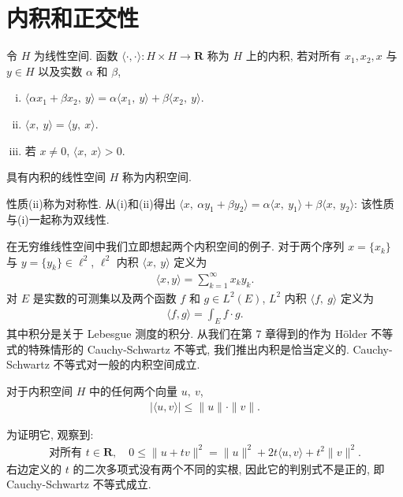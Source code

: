 \documentclass[../../main.tex]{subfiles}
\begin{document}
\section{内积和正交性}\label{section:ch16-inner-product}

\begin{definition}[内积空间]\label{definition:ch16-inner-product}
令 $H$ 为线性空间. 函数 $\langle\cdot,\cdot\rangle:H\times H\to\mathbf{R}$ 称为 $H$ 上的内积, 若对所有 $x_{1},x_{2},x$ 与 $y\in H$ 以及实数 $\alpha$ 和 $\beta$,
\begin{enumerate}[(i)]
\item $\langle\alpha x_{1}+\beta x_{2},\ y\rangle=\alpha\langle x_{1},\ y\rangle+\beta\langle x_{2},\ y\rangle$.
\item $\langle x,\ y\rangle=\langle y,\ x\rangle$.
\item 若 $x\neq 0$, $\langle x,\ x\rangle>0$.
\end{enumerate}
具有内积的线性空间 $H$ 称为内积空间.
\end{definition}

性质(ii)称为对称性. 从(i)和(ii)得出 $\langle x,\ \alpha y_{1}+\beta y_{2}\rangle=\alpha\langle x,\ y_{1}\rangle+\beta\langle x,\ y_{2}\rangle$: 该性质与(i)一起称为双线性.

在无穷维线性空间中我们立即想起两个内积空间的例子. 对于两个序列 $x=\{x_{k}\}$ 与 $y=\{y_{k}\}\in\ell^{2}$, $\ell^{2}$ 内积 $\langle x,\ y\rangle$ 定义为
\begin{align*}
\langle x,y\rangle=\sum_{k=1}^{\infty}x_{k}y_{k}.
\end{align*}
对 $E$ 是实数的可测集以及两个函数 $f$ 和 $g\in L^{2}(E)$, $L^{2}$ 内积 $\langle f,\ g\rangle$ 定义为
\begin{align*}
\langle f,g\rangle=\int_{E}f\cdot g.
\end{align*}
其中积分是关于 Lebesgue 测度的积分. 从我们在第 7 章得到的作为 H\"older 不等式的特殊情形的 Cauchy-Schwartz 不等式, 我们推出内积是恰当定义的. Cauchy-Schwartz 不等式对一般的内积空间成立.

\begin{theorem}\label{theorem:ch16-cauchy-schwartz}
对于内积空间 $H$ 中的任何两个向量 $u,\ v$,
\begin{align*}
|\langle u,v\rangle|\leqslant\|u\|\cdot\|v\|.
\end{align*}
\end{theorem}

为证明它, 观察到:
\begin{align*}
\text{对所有 }t\in\mathbf{R},\quad 0\leqslant\|u+tv\|^{2}=\|u\|^{2}+2t\langle u,v\rangle+t^{2}\|v\|^{2}.
\end{align*}
右边定义的 $t$ 的二次多项式没有两个不同的实根, 因此它的判别式不是正的, 即 Cauchy-Schwartz 不等式成立.
\end{document}
